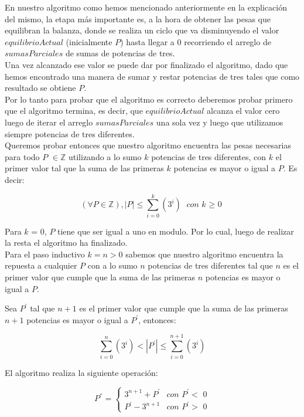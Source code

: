En nuestro algoritmo como hemos mencionado anteriormente en la explicaci\'on del mismo, la etapa m\'as importante es, a la hora de obtener las pesas que equilibran la balanza, donde se realiza un ciclo que va disminuyendo el valor $equilibrioActual$ (inicialmente $P$) hasta llegar a 0 recorriendo el arreglo de $sumasParciales$ de sumas de potencias de tres.\\
Una vez alcanzado ese valor se puede dar por finalizado el algoritmo, dado que hemos encontrado una manera de sumar y restar potencias de tres tales que como resultado se obtiene $P$.\\

Por lo tanto para probar que el algoritmo es correcto deberemos probar primero que el algoritmo termina, es decir, que $equilibrioActual$ alcanza el valor cero luego de iterar el arreglo $sumasParciales$ una sola vez y luego que utilizamos siempre potencias de tres diferentes.\\

Queremos probar entonces que nuestro algoritmo encuentra las pesas necesarias para todo $P$ $ \in \mathbb{Z}$ utilizando a lo sumo $k$ potencias de tres diferentes, con $k$ el primer valor tal que la suma de las primeras $k$ potencias es mayor o igual a $P$. Es decir:

\begin{equation}
(\forall P \in \mathbb{Z}), |P| \leq \sum_{i=0}^{k}(3^i) \textit{ con k $\geq$ 0}
\end{equation}

Para $k$ = 0, $P$ tiene que ser igual a uno en modulo. Por lo cual, luego de realizar la resta el algoritmo ha finalizado.\\

Para el paso inductivo $k = n > 0$ sabemos que nuestro algoritmo encuentra la repuesta a cualquier $P$ con a lo sumo $n$ potencias de tres diferentes tal que $n$ es el primer valor que cumple que la suma de las primeras $n$ potencias es mayor o igual a $P$.

Sea $P^{'}$ tal que $n+1$ es el primer valor que cumple que la suma de las primeras $n+1$ potencias es mayor o igual a $P^{'}$, entonces:

\begin{equation}
\sum_{i=0}^{n}(3^i) <  |P^{'}| \leq \sum_{i=0}^{n+1}(3^i) 
\end{equation}

El algoritmo realiza la siguiente operación:

\begin{equation}
P^{''} = \left\{ \begin{array}{lcc}
             3^{n+1} + P^{'} & \textit{con $P^{'} <$ 0} \\
              P^{'} - 3^{n+1} & \textit{con $P^{'} >$ 0} 
             \end{array}
             \right.
\end{equation} 


